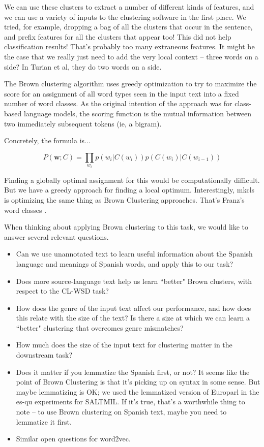 We can use these clusters to extract a number of different kinds of features,
and we can use a variety of inputs to the clustering software in the first
place.
We tried, for example, dropping a bag of all the clusters that occur in the
sentence, and prefix features for all the clusters that appear too!
This did not help classification results!
That's probably too many extraneous features.
It might be the case that we really just need to add the very local context --
three words on a side? In Turian et al, they do two words on a side.

The Brown clustering algorithm uses greedy optimization to try to maximize the
score for an assignment of all word types seen in the input text into a fixed
number of word classes. As the original intention of the approach was for
class-based language models, the scoring function is the mutual information
between two immediately subsequent tokens (ie, a bigram).

Concretely, the formula is...

\begin{equation} \label{eq:brownclassprob}
P(\boldsymbol{w}; C) = \prod_{w_i} p(w_i | C(w_i)) p(C(w_i) | C(w_{i-1}))
\end{equation}

Finding a globally optimal assignment for this would be computationally
difficult. But we have a greedy approach for finding a local optimum.
Interestingly, mkcls is optimizing the same thing as Brown Clustering
approaches. That's Franz's word classes \cite{och1999efficient}.

When thinking about applying Brown clustering to this task, we would like to
answer several relevant questions.

\begin{itemize}
  \item Can we use unannotated text to learn useful information about the
  Spanish language and meanings of Spanish words, and apply this to our task?
  \item Does more source-language text help us learn ``better" Brown clusters,
    with respect to the CL-WSD task?
  \item How does the genre of the input text affect our performance, and how
  does this relate with the size of the text? Is there a size at which we
    can learn a ``better" clustering that overcomes genre mismatches?
  \item How much does the size of the input text for clustering matter in the
  downstream task?
  \item Does it matter if you lemmatize the Spanish first, or not? It seems
    like the point of Brown Clustering is that it's picking up on syntax in
    some sense. But maybe lemmatizing is OK; we used the lemmatized version of
    Europarl in the es-qu experiments for SALTMIL. If it's true, that's a
    worthwhile thing to note -- to use Brown clustering on Spanish text, maybe
    you need to lemmatize it first.
  \item Similar open questions for word2vec.
\end{itemize}


